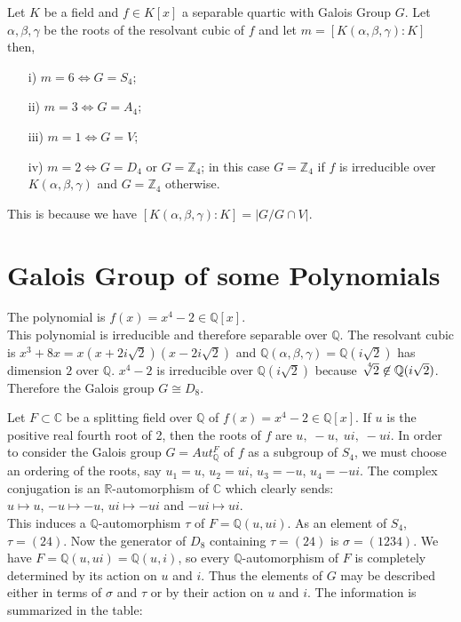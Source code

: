 \begin{theorem}
  Let \(K\) be a field and \(f \in K[x]\) a separable quartic with Galois Group \(G\). Let \(\alpha, \beta, \gamma\) be the roots of the resolvant cubic of \(f\) and let \(m= [K(\alpha, \beta, \gamma) : K]\) then,
\begin{enumerate}
\item[i)] \(m=6 \Longleftrightarrow G=S_4\);
\item[ii)] \(m=3 \Longleftrightarrow G=A_4\);
\item[iii)] \(m=1 \Longleftrightarrow G=V\);
\item[iv)] \(m=2 \Longleftrightarrow G=D_4\) or \(G={\mathbb{Z}}_4\); in this case \(G={\mathbb{Z}}_4\) if \(f\) is irreducible over \(K(\alpha, \beta, \gamma)\) and \(G={\mathbb{Z}}_4\) otherwise.
  \end{enumerate}
\end{theorem}
This is because we have \([K(\alpha,\beta,\gamma):K] = |G/G \cap V|\).

\section{Galois Group of some Polynomials}

\begin{example}
The polynomial is \(f(x)=x^4-2 \in \mathbb{Q}[x]\).\\
This polynomial is irreducible and therefore separable over \(\mathbb{Q}\). The resolvant cubic is \(x^3+8x = x(x+2i\sqrt{2})(x-2i\sqrt{2})\) and
\(\mathbb{Q}(\alpha,\beta, \gamma)=\mathbb{Q}(i\sqrt{2})\) has dimension \(2\) over \(\mathbb{Q}\). \(x^4-2\) is irreducible over \(\mathbb{Q}(i\sqrt{2})\) because \(\sqrt[\leftroot{-3}\uproot{3}4]{2} \not\in \mathbb{Q}(i\sqrt{2})\).
Therefore the Galois group \(G \cong D_8\).
\end{example}

Let \(F \subset \mathbb{C}\) be a splitting field over \(\mathbb{Q}\) of \(f(x)=x^4-2 \in \mathbb{Q}[x]\). If \(u\) is the positive real fourth root of 2, then the roots of \(f\) are \(u,\; -u,\; ui,\; -ui\). In order to consider the Galois group \(G = Aut_{\mathbb{Q}}^F\) of \(f\) as a subgroup of \(S_4\), we must choose an ordering of the roots, say
\(u_1=u\), \(u_2=ui\), \(u_3=-u\), \(u_4= -ui\). The complex conjugation is an \(\mathbb{R}\)-automorphism of \(\mathbb{C}\) which clearly sends:\\
\(u \mapsto u\), \(-u \mapsto -u\), \(ui \mapsto -ui\) and \(-ui \mapsto ui\). \\
This induces a \(\mathbb{Q}\)-automorphism \(\tau\) of \(F=\mathbb{Q}(u,ui)\). As an element of \(S_4\), \(\tau=(24)\).
Now the generator of \(D_8\) containing \(\tau = (24)\) is \(\sigma = (1234)\). We have \(F=\mathbb{Q}(u,ui)=\mathbb{Q}(u,i)\),
so every \(\mathbb{Q}\)-automorphism of \(F\) is completely determined by its action on \(u\) and \(i\). Thus the elements of \(G\)
may be described either in terms of \(\sigma\) and \(\tau\) or by their action on \(u\) and \(i\). The information is summarized in the table:\\[2mm]

